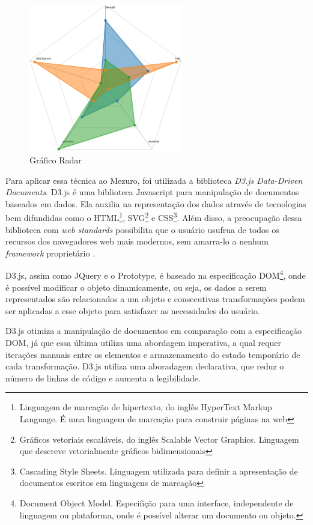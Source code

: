 \graphicspath{{figuras/}}
\begin{figure}[h]
\centering
\includegraphics[width=0.6\textwidth]{radar_chart}
\caption{Gráfico Radar \cite{alvarograves2014}}
\label{radar-chart}
\end{figure}

Para aplicar essa técnica ao Mezuro, foi utilizada a biblioteca \textit{D3.js Data-Driven Documents}. D3.js é uma biblioteca Javascript para manipulação de documentos baseados em dados. Ela auxilia na representação dos dados através de tecnologias bem difundidas como o HTML\footnote{Linguagem de marcação de hipertexto, do inglês HyperText Markup Language. É uma linguagem de marcação para construir páginas na web}, SVG\footnote{Gráficos vetoriais escaláveis, do inglês Scalable Vector Graphics. Linguagem que descreve vetorialmente gráficos bidimensionais} e CSS\footnote{Cascading Style Sheets. Linguagem utilizada para definir a apresentação de documentos escritos em linguagens de marcação}. Além disso, a preocupação dessa biblioteca com \textit{web standards} possibilita que o usuário usufrua de todos os recursos dos navegadores web mais modernos, sem amarra-lo a nenhum \textit{framework} proprietário \cite{d3js2014info}.

D3.js, assim como JQuery e o Prototype, é baseado na especificação DOM\footnote{Document Object Model. Especifição para uma interface, independente de linguagem ou plataforma, onde é possível alterar um documento ou objeto.}, onde é possível modificar o objeto dinamicamente, ou seja, os dados a serem representados são relacionados a um objeto e consecutivas transformações podem ser aplicadas a esse objeto para satisfazer as necessidades do usuário. 

D3.js otimiza a manipulação de documentos em comparação com a especificação DOM, já que essa última utiliza uma abordagem imperativa, a qual requer iterações manuais entre os elementos e armazenamento do estado temporário de cada transformação. D3.js utiliza uma aboradagem declarativa, que reduz o número de linhas de código e aumenta a legibilidade.

